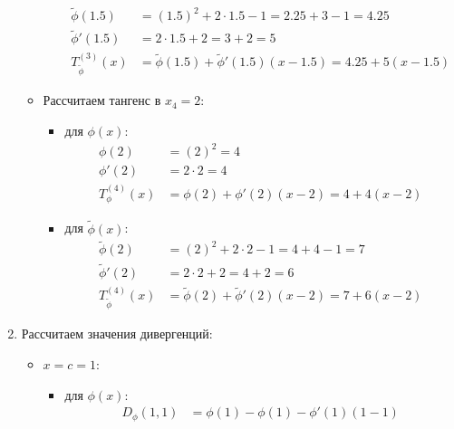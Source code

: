 \documentclass[12pt]{scrartcl}
\begin{document}
\begin{enumerate}
\begin{itemize}
\begin{itemize}
\begin{align*}
                \tilde{\phi}(1.5) &= (1.5)^2 + 2 \cdot 1.5 - 1 = 2.25 + 3 - 1 = 4.25 \\
                \tilde{\phi}'(1.5) &= 2 \cdot 1.5 + 2 = 3 + 2 = 5 \\
                T_{\tilde{\phi}}^{(3)}(x) &= \tilde{\phi}(1.5) + \tilde{\phi}'(1.5)(x - 1.5) = 4.25 + 5(x - 1.5)
            \end{align*}
        \end{itemize}
        \item Рассчитаем тангенс в $x_{4} = 2$:
        \begin{itemize}
            \item для $\phi(x)$:
            \begin{align*}
                \phi(2) &= (2)^2 = 4 \\
                \phi'(2) &= 2 \cdot 2 = 4 \\
                T_{\phi}^{(4)}(x) &= \phi(2) + \phi'(2)(x - 2) = 4 + 4(x - 2)
            \end{align*}
            \item для $\tilde{\phi}(x)$:
            \begin{align*}
                \tilde{\phi}(2) &= (2)^2 + 2 \cdot 2 - 1 = 4 + 4 - 1 = 7 \\
                \tilde{\phi}'(2) &= 2 \cdot 2 + 2 = 4 + 2 = 6 \\
                T_{\tilde{\phi}}^{(4)}(x) &= \tilde{\phi}(2) + \tilde{\phi}'(2)(x - 2) = 7 + 6(x - 2)
            \end{align*}
        \end{itemize}
    \end{itemize}
    \item Рассчитаем значения дивергенций:
    \begin{itemize}
        \item $x = c = 1$:
        \begin{itemize}
            \item для $\phi(x)$:
            \begin{align*}
                D_{\phi}(1, 1) &= \phi(1) - \phi(1) - \phi'(1)(1 - 1) \\

\end{align*}
\end{itemize}
\end{itemize}
\end{enumerate}
\end{document}
